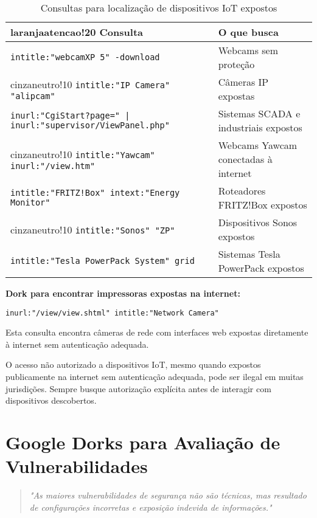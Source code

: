 \documentclass[12pt,a4paper]{book}
\begin{document}
\begin{table}[h]
\centering
\begin{tabular}{|p{8cm}|p{7cm}|}
\hline
{laranjaatencao!20} \textbf{Consulta} & \textbf{O que busca} \\
\hline
\texttt{intitle:"webcamXP 5" -download} & Webcams sem proteção \\
\hline
{cinzaneutro!10} \texttt{intitle:"IP Camera" "alipcam"} & Câmeras IP expostas \\
\hline
\texttt{inurl:"CgiStart?page=" | inurl:"supervisor/ViewPanel.php"} & Sistemas SCADA e industriais expostos \\
\hline
{cinzaneutro!10} \texttt{intitle:"Yawcam" inurl:"/view.htm"} & Webcams Yawcam conectadas à internet \\
\hline
\texttt{intitle:"FRITZ!Box" intext:"Energy Monitor"} & Roteadores FRITZ!Box expostos \\
\hline
{cinzaneutro!10} \texttt{intitle:"Sonos" "ZP"} & Dispositivos Sonos expostos \\
\hline
\texttt{intitle:"Tesla PowerPack System" grid} & Sistemas Tesla PowerPack expostos \\
\hline
\end{tabular}
\caption{Consultas para localização de dispositivos IoT expostos}
\end{table}

\begin{examplebox}
\textbf{Dork para encontrar impressoras expostas na internet:}

\texttt{inurl:"/view/view.shtml" intitle:"Network Camera"} 

Esta consulta encontra câmeras de rede com interfaces web expostas diretamente à internet sem autenticação adequada.
\end{examplebox}

\begin{alertbox}
O acesso não autorizado a dispositivos IoT, mesmo quando expostos publicamente na internet sem autenticação adequada, pode ser ilegal em muitas jurisdições. Sempre busque autorização explícita antes de interagir com dispositivos descobertos.
\end{alertbox}

\chapter{Google Dorks para Avaliação de Vulnerabilidades}

\begin{quote}
\textit{"As maiores vulnerabilidades de segurança não são técnicas, mas resultado de configurações incorretas e exposição indevida de informações."} \\
\end{quote}
\end{document}
